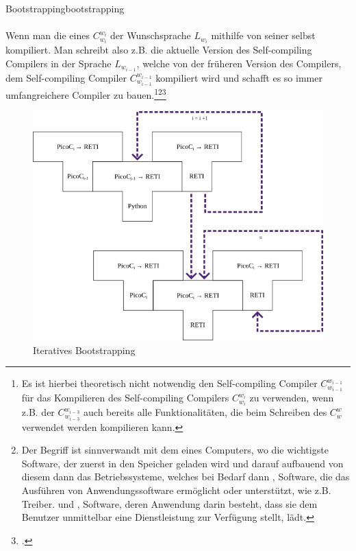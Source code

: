 \begin{Definition}{Bootstrapping}{bootstrapping}
  \paragraph{}\label{par:bootstrapping}\hspace{-0.25cm}
  Wenn man die  eines  $C_{w_i}^{w_i}$ der Wunschsprache $L_{w_i}$ mithilfe von  seiner selbst kompiliert. Man schreibt also z.B. die aktuelle Version des Self-compiling Compilers in der Sprache $L_{w_{i-1}}$, welche von der früheren Version des Compilers, dem Self-compiling Compiler $C_{w_{i-1}}^{w_{i-1}}$ kompiliert wird und schafft es so  immer umfangreichere Compiler zu bauen.\footnote{Es ist hierbei theoretisch nicht notwendig den  Self-compiling Compiler $C_{w_{i-1}}^{w_{i-1}}$ für das Kompilieren des  Self-compiling Compilers $C_{w_i}^{w_i}$ zu verwenden, wenn z.B. der  $C_{w_{i-3}}^{w_{i-3}}$ auch bereits alle Funktionalitäten, die beim Schreiben des  $C_w^w$ verwendet werden kompilieren kann.}\footnote{Der Begriff ist sinnverwandt mit dem  eines Computers, wo die wichtigste Software, der  zuerst in den Speicher geladen wird und darauf aufbauend von diesem dann das Betriebssysteme, welches bei Bedarf dann , Software, die das Ausführen von Anwendungssoftware ermöglicht oder unterstützt, wie z.B. Treiber. und , Software, deren Anwendung darin besteht, dass sie dem Benutzer unmittelbar eine Dienstleistung zur Verfügung stellt, lädt.}\footcite{earley_formalism_1970}
\end{Definition}

\begin{figure}[H]
  \centering
  \includegraphics[width=0.66\linewidth]{./figures/bootstrapping.png}
  \caption{Iteratives Bootstrapping}
\end{figure}

